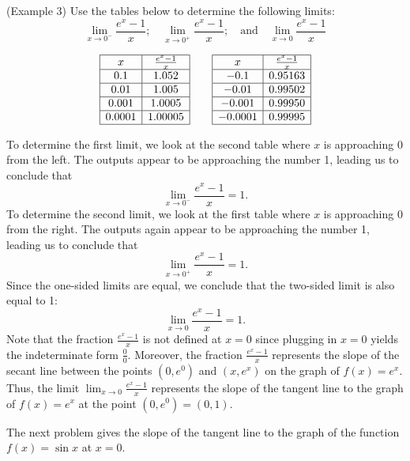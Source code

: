 \documentclass[handout]{ximera}
\begin{document}
\begin{example}(Example 3)
Use the tables below to determine the following limits:
\[
\lim_{x \to 0^-} \frac{e^x - 1}{x}; \quad \lim_{x \to 0^+} \frac{e^x - 1}{x}; \quad\mbox{and} \quad \lim_{x \to 0} \frac{e^x - 1}{x}
\]

\[
\begin{array}{|c | c|}
	\hline
  x & \frac{e^x-1}{x}\\
  \hline
  0.1 & 1.052 \\
  \hline
  0.01 & 1.005 \\
  \hline
  0.001 & 1.0005 \\
  \hline
  0.0001 & 1.00005\\
	\hline
\end{array}
\qquad
\begin{array}{ |c | c |}
	\hline
  x & \frac{e^x - 1}{x}\\
  \hline
 -0.1 & 0.95163 \\ 
  \hline
 -0.01 & 0.99502 \\
  \hline
 -0.001 & 0.99950 \\
  \hline
 -0.0001 & 0.99995\\
 \hline
\end{array}\]

To determine the first limit, we look at the second table where $x$ is approaching $0$ from the left. 
The outputs appear to be approaching the number 1, leading us to conclude that
\[\lim_{x \to 0^-} \frac{e^x - 1}{x} = 1.\]
To determine the second limit, we look at the first table where $x$ is approaching $0$ from the right.
The outputs again appear to be approaching the number 1, leading us to conclude that
\[\lim_{x \to 0^+} \frac{e^x - 1}{x} = 1.\]
Since the one-sided limits are equal, we conclude that the two-sided limit is also equal to 1:
\[\lim_{x \to 0} \frac{e^x - 1}{x} = 1.\]
Note that the fraction $\frac{e^x - 1}{x}$ is not defined at $x=0$ since plugging in $x=0$ yields the indeterminate form $\frac{0}{0}$.
Moreover, the fraction $\frac{e^x - 1}{x}$ represents the slope of the secant line between the points $(0, e^0)$ and $(x, e^x)$ on the graph of $f(x) = e^x$.
Thus, the limit $\lim_{x \to 0} \frac{e^x - 1}{x}$ represents the slope of the tangent line to the graph of $f(x) = e^x$ at the point $(0, e^0) = (0,1)$.
\end{example}

The next problem gives the slope of the tangent line to the graph of the function $f(x) = \sin x$ at $x=0$.
\end{document}
